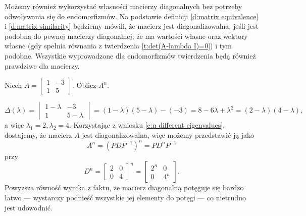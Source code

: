 Możemy również wykorzystać własności macierzy diagonalnych bez potrzeby odwoływania się do endomorfizmów. Na podstawie definicji \ref{d:matrix equivalence} i \ref{d:matrix similarity} będziemy mówili, że macierz jest diagonalizowalna, jeśli jest podobna do pewnej macierzy diagonalnej; że ma wartości własne oraz wektory własne (gdy spełnia równania z twierdzenia \ref{t:det(A-lambda I)=0}) i tym podobne. Wszystkie wyprowadzone dla endomorfizmów twierdzenia będą również prawdziwe dla macierzy.

\begin{example}
    Niech $A = \begin{bmatrix}
        1 & -3 \\
        1 & 5
    \end{bmatrix}$. Oblicz $A^n$.
\end{example}
\begin{solution}
    \[ \Delta(\lambda) = \begin{vmatrix}
        1 - \lambda & -3 \\
        1 & 5 - \lambda
    \end{vmatrix} = (1-\lambda)(5-\lambda) - (-3) = 8 - 6\lambda + \lambda^2 = (2 - \lambda)(4 - \lambda), \]
    a więc $\lambda_1 = 2, \lambda_2 = 4$. Korzystając z wniosku \ref{c:n different eigenvalues}, dostajemy, że macierz $A$ jest diagonalizowalna, więc możemy przedstawić ją jako
    \[ A^n = (PDP^{-1})^n = PD^nP^{-1} \]
    przy
    \[ D^n = \begin{bmatrix}
        2 & 0 \\
        0 & 4
    \end{bmatrix}^n = \begin{bmatrix}
        2^n & 0 \\
        0 & 4^n
    \end{bmatrix}. \]
    Powyższa równość wynika z faktu, że macierz diagonalną potęguje się bardzo łatwo --- wystarczy podnieść wszystkie jej elementy do potęgi --- co nietrudno jest udowodnić.


\end{solution}
